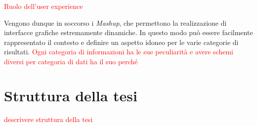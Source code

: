 \textcolor{red}{Ruolo dell'user experience}

Vengono dunque in soccorso i \emph{Mashup}, che permettono la realizzazione di interfacce grafiche estremamente dinamiche. In questo modo può essere facilmente rappresentato il contesto e definire un aspetto idoneo per le varie categorie di risultati. \textcolor{red}{Ogni categoria di informazioni ha le sue peculiarità e avere schemi diversi per categoria di dati ha il suo perché}



\section{Struttura della tesi\label{sec:struttura-tesi}}




\textcolor{red}{descrivere struttura della tesi}